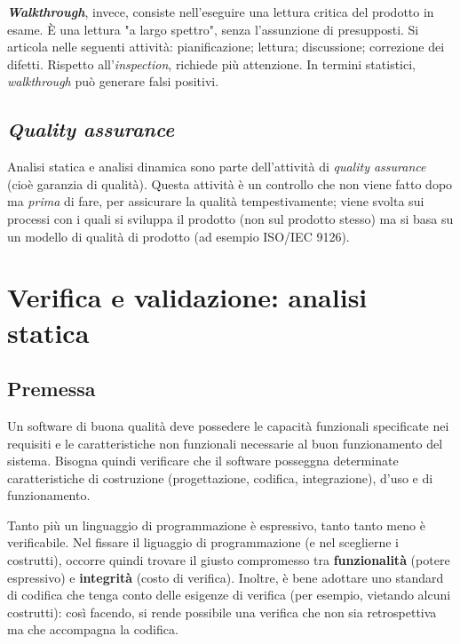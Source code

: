 \documentclass[a4paper]{article}
\begin{document}
\textbf{\emph{Walkthrough}}, invece, consiste nell'eseguire una lettura critica del prodotto in esame. È una lettura "a largo spettro", senza l'assunzione di presupposti. Si articola nelle seguenti attività: pianificazione; lettura; discussione; correzione dei difetti. Rispetto all'\emph{inspection}, richiede più attenzione. In termini statistici, \emph{walkthrough} può generare falsi positivi.

		
	\subsection{\emph{Quality assurance}}

		
Analisi statica e analisi dinamica sono parte dell'attività di \emph{quality assurance} (cioè garanzia di qualità). Questa attività è un controllo che non viene fatto dopo ma \emph{prima} di fare, per assicurare la qualità tempestivamente; viene svolta sui processi con i quali si sviluppa il prodotto (non sul prodotto stesso) ma si basa su un modello di qualità di prodotto (ad esempio ISO/IEC 9126).
	


		
	\section{Verifica e validazione: analisi statica}


		
	\subsection{Premessa}

		
Un software di buona qualità deve possedere le capacità funzionali specificate nei requisiti e le caratteristiche non funzionali necessarie al buon funzionamento del sistema. Bisogna quindi verificare che il software posseggna determinate caratteristiche di costruzione (progettazione, codifica, integrazione), d'uso e di funzionamento.
		
Tanto più un linguaggio di programmazione è espressivo, tanto tanto meno è verificabile. Nel fissare il liguaggio di programmazione (e nel sceglierne i costrutti), occorre quindi trovare il giusto compromesso tra \textbf{funzionalità} (potere espressivo) e \textbf{integrità} (costo di verifica). Inoltre, è bene adottare uno standard di codifica che tenga conto delle esigenze di verifica (per esempio, vietando alcuni costrutti): così facendo, si rende possibile una verifica che non sia retrospettiva ma che accompagna la codifica.
		
\end{document}
